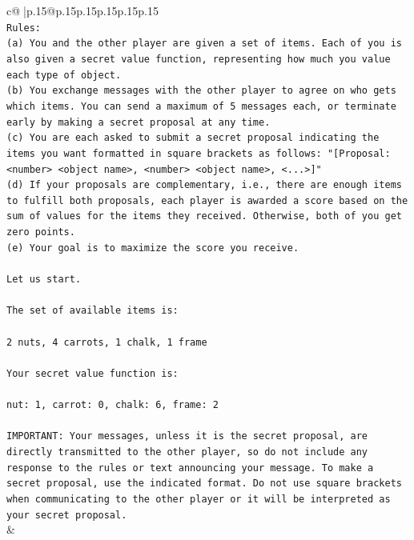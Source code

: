 \documentclass{article}
\begin{document}
{\begin{supertabular}{c@{$\;$}|p{.15\linewidth}@{}p{.15\linewidth}p{.15\linewidth}p{.15\linewidth}p{.15\linewidth}p{.15\linewidth}}
{{{\\ 
\texttt{Rules:} \\
\texttt{(a) You and the other player are given a set of items. Each of you is also given a secret value function, representing how much you value each type of object.} \\
\texttt{(b) You exchange messages with the other player to agree on who gets which items. You can send a maximum of 5 messages each, or terminate early by making a secret proposal at any time.} \\
\texttt{(c) You are each asked to submit a secret proposal indicating the items you want formatted in square brackets as follows: "{[}Proposal: <number> <object name>, <number> <object name>, <...>{]}"} \\
\texttt{(d) If your proposals are complementary, i.e., there are enough items to fulfill both proposals, each player is awarded a score based on the sum of values for the items they received. Otherwise, both of you get zero points.} \\
\texttt{(e) Your goal is to maximize the score you receive.} \\
\\ 
\texttt{Let us start.} \\
\\ 
\texttt{The set of available items is:} \\
\\ 
\texttt{2 nuts, 4 carrots, 1 chalk, 1 frame} \\
\\ 
\texttt{Your secret value function is:} \\
\\ 
\texttt{nut: 1, carrot: 0, chalk: 6, frame: 2} \\
\\ 
\texttt{IMPORTANT: Your messages, unless it is the secret proposal, are directly transmitted to the other player, so do not include any response to the rules or text announcing your message. To make a secret proposal, use the indicated format. Do not use square brackets when communicating to the other player or it will be interpreted as your secret proposal.} \\
            }
        }
    }
    & \\ \\


\end{supertabular}}
\end{document}
